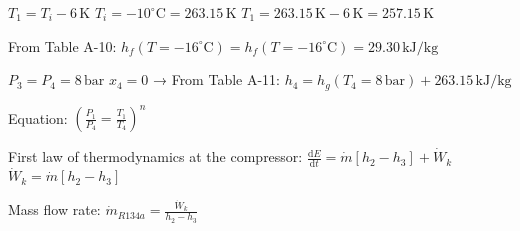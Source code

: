 \( T_1 = T_i - 6 \, \text{K} \)  
\( T_i = -10^\circ \text{C} = 263.15 \, \text{K} \)  
\( T_1 = 263.15 \, \text{K} - 6 \, \text{K} = 257.15 \, \text{K} \)  

From Table A-10:  
\( h_f(T = -16^\circ \text{C}) = h_f(T = -16^\circ \text{C}) = 29.30 \, \text{kJ/kg} \)  

\( P_3 = P_4 = 8 \, \text{bar} \)  
\( x_4 = 0 \) → From Table A-11:  
\( h_4 = h_g(T_4 = 8 \, \text{bar}) + 263.15 \, \text{kJ/kg} \)  

Equation:  
\( \left( \frac{P_1}{P_4} = \frac{T_1}{T_4} \right)^n \)  

First law of thermodynamics at the compressor:  
\( \frac{\text{d}E}{\text{d}t} = \dot{m} \left[ h_2 - h_3 \right] + \dot{W}_k \)  
\( \dot{W}_k = \dot{m} \left[ h_2 - h_3 \right] \)  

Mass flow rate:  
\( \dot{m}_{R134a} = \frac{\dot{W}_k}{h_2 - h_3} \)